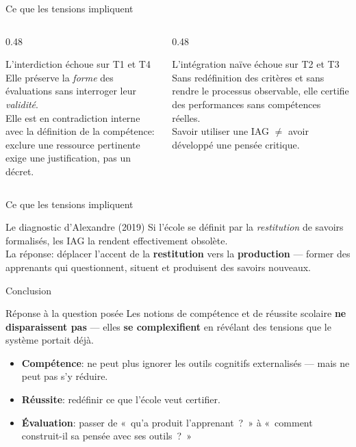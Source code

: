 \begin{frame}{Ce que les tensions impliquent}
  \begin{columns}[T]
    \begin{column}{0.48\textwidth}
      \begin{block}{L'interdiction échoue sur T1 et T4}
        Elle préserve la \emph{forme} des évaluations
        sans interroger leur \emph{validité}.\\
        Elle est en contradiction interne avec la
        définition de la compétence: exclure une
        ressource pertinente exige une justification,
        pas un décret.
      \end{block}
    \end{column}
    \begin{column}{0.48\textwidth}
      \begin{block}{L'intégration naïve échoue sur T2 et T3}
        Sans redéfinition des critères et sans
        rendre le processus observable, elle certifie
        des performances sans compétences réelles.\\
        Savoir utiliser une IAG $\neq$ avoir développé
        une pensée critique.
      \end{block}
    \end{column}
  \end{columns}
\end{frame}

\begin{frame}{Ce que les tensions impliquent}

  \begin{alertblock}{Le diagnostic d'Alexandre (2019)}
    Si l'école se définit par la \emph{restitution} de savoirs formalisés,
    les IAG la rendent effectivement obsolète.\\
    La réponse: déplacer l'accent de la \textbf{restitution}
    vers la \textbf{production} --- former des apprenants qui
    questionnent, situent et produisent des savoirs nouveaux.
  \end{alertblock}
\end{frame}

\begin{frame}{Conclusion}
  \begin{block}{Réponse à la question posée}
    Les notions de compétence et de réussite scolaire
    \textbf{ne disparaissent pas} --- elles \textbf{se complexifient}
    en révélant des tensions que le système portait déjà.
  \end{block}

  \vspace{0.5em}

  \begin{itemize}
    \item \textbf{Compétence}: ne peut plus ignorer les outils cognitifs
          externalisés --- mais ne peut pas s'y réduire.
    \item \textbf{Réussite}: redéfinir ce que l'école veut certifier.
    \item \textbf{Évaluation}: passer de «~qu'a produit l'apprenant~?~»
          à «~comment construit-il sa pensée avec ses outils~?~»
  \end{itemize}
\end{frame}


